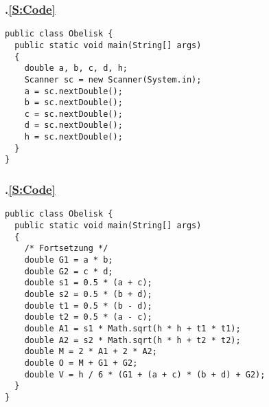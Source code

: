 \begin{frame}[fragile]%
    \frametitle{\kap.\ref{S:Code} \stitle}%

\begin{lstlisting}[style=java]
public class Obelisk {
  public static void main(String[] args)
  {
    double a, b, c, d, h;
    Scanner sc = new Scanner(System.in);
    a = sc.nextDouble();
    b = sc.nextDouble();
    c = sc.nextDouble();
    d = sc.nextDouble();
    h = sc.nextDouble();
  }
}
\end{lstlisting}
\end{frame}


\begin{frame}[fragile]%
    \frametitle{\kap.\ref{S:Code} \stitle}%

\begin{lstlisting}[style=java]
public class Obelisk {
  public static void main(String[] args)
  {
    /* Fortsetzung */
    double G1 = a * b;
    double G2 = c * d;
    double s1 = 0.5 * (a + c);
    double s2 = 0.5 * (b + d);
    double t1 = 0.5 * (b - d);
    double t2 = 0.5 * (a - c);
    double A1 = s1 * Math.sqrt(h * h + t1 * t1);
    double A2 = s2 * Math.sqrt(h * h + t2 * t2);
    double M = 2 * A1 + 2 * A2;
    double O = M + G1 + G2;
    double V = h / 6 * (G1 + (a + c) * (b + d) + G2);
  }
}
\end{lstlisting}
\end{frame}
